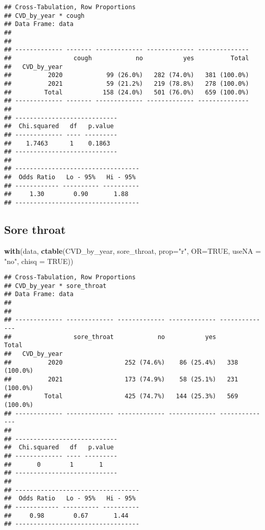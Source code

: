 \documentclass[
]{article}
\newenvironment{Shaded}{\begin{snugshade}}{\end{snugshade}}
\newcommand{\AttributeTok}[1]{\textcolor[rgb]{0.13,0.29,0.53}{#1}}
\newcommand{\ConstantTok}[1]{\textcolor[rgb]{0.56,0.35,0.01}{#1}}
\newcommand{\FunctionTok}[1]{\textcolor[rgb]{0.13,0.29,0.53}{\textbf{#1}}}
\newcommand{\NormalTok}[1]{#1}
\newcommand{\StringTok}[1]{\textcolor[rgb]{0.31,0.60,0.02}{#1}}
\begin{document}
\begin{verbatim}
## Cross-Tabulation, Row Proportions  
## CVD_by_year * cough  
## Data Frame: data  
## 
## 
## ------------- ------- ------------- ------------- --------------
##                 cough            no           yes          Total
##   CVD_by_year                                                   
##          2020            99 (26.0%)   282 (74.0%)   381 (100.0%)
##          2021            59 (21.2%)   219 (78.8%)   278 (100.0%)
##         Total           158 (24.0%)   501 (76.0%)   659 (100.0%)
## ------------- ------- ------------- ------------- --------------
## 
## ----------------------------
##  Chi.squared   df   p.value 
## ------------- ---- ---------
##    1.7463      1    0.1863  
## ----------------------------
## 
## ----------------------------------
##  Odds Ratio   Lo - 95%   Hi - 95% 
## ------------ ---------- ----------
##     1.30        0.90       1.88   
## ----------------------------------
\end{verbatim}

\hypertarget{sore-throat}{%
\subsection{Sore throat}\label{sore-throat}}

\begin{Shaded}
\begin{Highlighting}[]
\FunctionTok{with}\NormalTok{(data, }\FunctionTok{ctable}\NormalTok{(CVD\_by\_year, sore\_throat, }\AttributeTok{prop=}\StringTok{"r"}\NormalTok{, }\AttributeTok{OR=}\ConstantTok{TRUE}\NormalTok{, }\AttributeTok{useNA =} \StringTok{"no"}\NormalTok{, }\AttributeTok{chisq =} \ConstantTok{TRUE}\NormalTok{))}
\end{Highlighting}
\end{Shaded}

\begin{verbatim}
## Cross-Tabulation, Row Proportions  
## CVD_by_year * sore_throat  
## Data Frame: data  
## 
## 
## ------------- ------------- ------------- ------------- --------------
##                 sore_throat            no           yes          Total
##   CVD_by_year                                                         
##          2020                 252 (74.6%)    86 (25.4%)   338 (100.0%)
##          2021                 173 (74.9%)    58 (25.1%)   231 (100.0%)
##         Total                 425 (74.7%)   144 (25.3%)   569 (100.0%)
## ------------- ------------- ------------- ------------- --------------
## 
## ----------------------------
##  Chi.squared   df   p.value 
## ------------- ---- ---------
##       0        1       1    
## ----------------------------
## 
## ----------------------------------
##  Odds Ratio   Lo - 95%   Hi - 95% 
## ------------ ---------- ----------
##     0.98        0.67       1.44   
## ----------------------------------
\end{verbatim}
\end{document}
